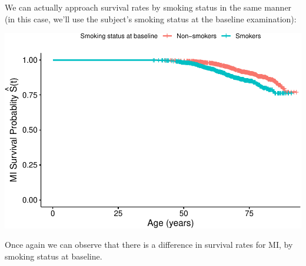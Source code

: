 \documentclass[
]{book}
\newenvironment{Shaded}{\begin{snugshade}}{\end{snugshade}}
\newcommand{\DataTypeTok}[1]{\textcolor[rgb]{0.13,0.29,0.53}{#1}}
\newcommand{\KeywordTok}[1]{\textcolor[rgb]{0.13,0.29,0.53}{\textbf{#1}}}
\newcommand{\NormalTok}[1]{#1}
\newcommand{\OperatorTok}[1]{\textcolor[rgb]{0.81,0.36,0.00}{\textbf{#1}}}
\newcommand{\StringTok}[1]{\textcolor[rgb]{0.31,0.60,0.02}{#1}}
\begin{document}
We can actually approach survival rates by smoking status in the same manner (in this case, we'll use the subject's smoking status at the baseline examination):

\begin{Shaded}
\end{Shaded}

\includegraphics{adv_epi_analysis_files/figure-latex/unnamed-chunk-205-1.pdf}

Once again we can observe that there is a difference in survival rates for MI, by smoking status at baseline.
\end{document}
